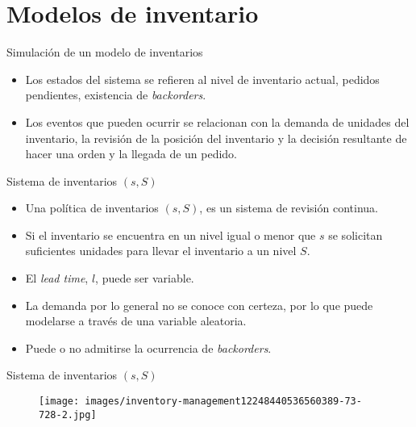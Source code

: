 \section{Modelos de inventario}

\begin{frame}{Simulación de un modelo de inventarios}
    \begin{itemize}
        \item Los estados del sistema se refieren al nivel de inventario actual, pedidos pendientes, existencia de \textit{backorders}.
        \item Los eventos que pueden ocurrir se relacionan con la demanda de unidades del inventario, la revisión de la posición del inventario y la decisión resultante de hacer una orden y la llegada de un pedido.
    \end{itemize}
\end{frame}

\begin{frame}{Sistema de inventarios $(s,S)$}
    \begin{itemize}
        \item Una política de inventarios $(s,S)$, es un sistema de revisión continua.
        \item Si el inventario se encuentra en un nivel igual o menor que $s$ se solicitan suficientes unidades para llevar el inventario a un nivel $S$.
        \item El \textit{lead time}, $l$, puede ser variable.
        \item La demanda por lo general no se conoce con certeza, por lo que puede modelarse a través de una variable aleatoria.
        \item Puede o no admitirse la ocurrencia de \textit{backorders}.
    \end{itemize}
\end{frame}

\begin{frame}{Sistema de inventarios $(s,S)$}
    \begin{figure}
        \centering
        \texttt{[image: images/inventory-management12248440536560389-73-728-2.jpg]}
        \label{fig:my_label}
    \end{figure}
\end{frame}

